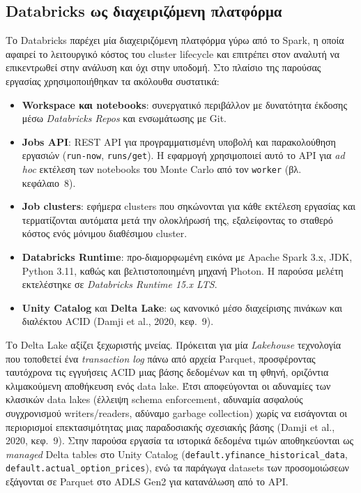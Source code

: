 \documentclass[12pt]{article}
\begin{document}
\subsection{Databricks ως διαχειριζόμενη πλατφόρμα}
Το Databricks παρέχει μία διαχειριζόμενη πλατφόρμα γύρω από το Spark, η οποία αφαιρεί το λειτουργικό κόστος του cluster lifecycle και επιτρέπει στον αναλυτή να επικεντρωθεί στην ανάλυση και όχι στην υποδομή. Στο πλαίσιο της παρούσας εργασίας χρησιμοποιήθηκαν τα ακόλουθα συστατικά:
\begin{itemize}
  \item \textbf{Workspace και notebooks}: συνεργατικό περιβάλλον με δυνατότητα έκδοσης μέσω \emph{Databricks Repos} και ενσωμάτωσης με Git.
  \item \textbf{Jobs API}: REST API για προγραμματισμένη υποβολή και παρακολούθηση εργασιών (\texttt{run-now}, \texttt{runs/get}). Η εφαρμογή χρησιμοποιεί αυτό το API για \emph{ad hoc} εκτέλεση των notebooks του Monte Carlo από τον \texttt{worker} (βλ. κεφάλαιο~8).
  \item \textbf{Job clusters}: εφήμερα clusters που σηκώνονται για κάθε εκτέλεση εργασίας και τερματίζονται αυτόματα μετά την ολοκλήρωσή της, εξαλείφοντας το σταθερό κόστος ενός μόνιμου διαθέσιμου cluster.
  \item \textbf{Databricks Runtime}: προ-διαμορφωμένη εικόνα με Apache Spark 3.x, JDK, Python 3.11, καθώς και βελτιστοποιημένη μηχανή Photon. Η παρούσα μελέτη εκτελέστηκε σε \emph{Databricks Runtime 15.x LTS}.
  \item \textbf{Unity Catalog} και \textbf{Delta Lake}: ως κανονικό μέσο διαχείρισης πινάκων και διαλέκτου ACID (Damji et al., 2020, κεφ.~9).
\end{itemize}

Το Delta Lake αξίζει ξεχωριστής μνείας. Πρόκειται για μία \emph{Lakehouse} τεχνολογία που τοποθετεί ένα \emph{transaction log} πάνω από αρχεία Parquet, προσφέροντας ταυτόχρονα τις εγγυήσεις ACID μιας βάσης δεδομένων και τη φθηνή, οριζόντια κλιμακούμενη αποθήκευση ενός data lake. Έτσι αποφεύγονται οι αδυναμίες των κλασικών data lakes (έλλειψη schema enforcement, αδυναμία ασφαλούς συγχρονισμού writers/readers, αδύναμο garbage collection) χωρίς να εισάγονται οι περιορισμοί επεκτασιμότητας μιας παραδοσιακής σχεσιακής βάσης (Damji et al., 2020, κεφ.~9). Στην παρούσα εργασία τα ιστορικά δεδομένα τιμών αποθηκεύονται ως \emph{managed} Delta tables στο Unity Catalog (\texttt{default.yfinance\_historical\_data}, \texttt{default.actual\_option\_prices}), ενώ τα παράγωγα datasets των προσομοιώσεων εξάγονται σε Parquet στο ADLS Gen2 για κατανάλωση από το API.
\end{document}
